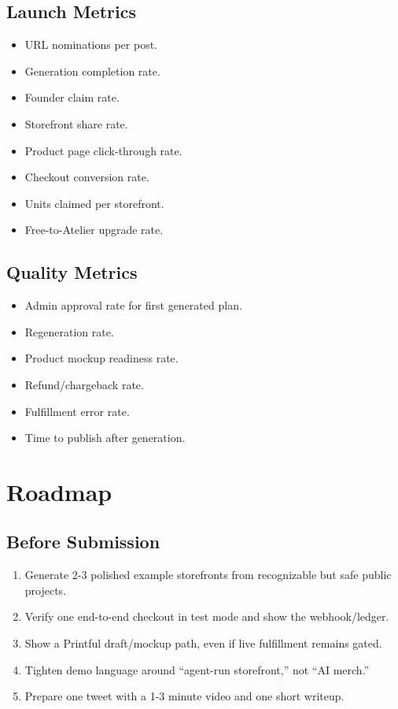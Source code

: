 \documentclass[11pt]{article}
\begin{document}
\subsection{Launch Metrics}

\begin{itemize}
  \item URL nominations per post.
  \item Generation completion rate.
  \item Founder claim rate.
  \item Storefront share rate.
  \item Product page click-through rate.
  \item Checkout conversion rate.
  \item Units claimed per storefront.
  \item Free-to-Atelier upgrade rate.
\end{itemize}

\subsection{Quality Metrics}

\begin{itemize}
  \item Admin approval rate for first generated plan.
  \item Regeneration rate.
  \item Product mockup readiness rate.
  \item Refund/chargeback rate.
  \item Fulfillment error rate.
  \item Time to publish after generation.
\end{itemize}

\section{Roadmap}

\subsection{Before Submission}

\begin{enumerate}
  \item Generate 2-3 polished example storefronts from recognizable but safe public projects.
  \item Verify one end-to-end checkout in test mode and show the webhook/ledger.
  \item Show a Printful draft/mockup path, even if live fulfillment remains gated.
  \item Tighten demo language around ``agent-run storefront,'' not ``AI merch.''
  \item Prepare one tweet with a 1-3 minute video and one short writeup.
\end{enumerate}
\end{document}
